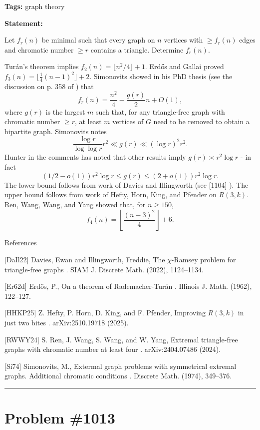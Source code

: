\documentclass{article}
\begin{document}
\noindent\textbf{Tags:} graph theory

\medskip

\noindent\textbf{Statement:}

Let $f_r(n)$ be minimal such that every graph on $n$ vertices with $\geq f_r(n)$ edges and chromatic number $\geq r$ contains a triangle. Determine $f_r(n)$.




Tur\'{a}n's theorem implies $f_2(n)=\lfloor n^2/4\rfloor+1$. Erd\H{o}s and Gallai \cite{Er62d} proved $f_3(n)=\lfloor \frac{1}{4}(n-1)^2\rfloor+2$. Simonovits showed in his PhD thesis (see the discussion on p. 358 of \cite{Si74}) that\[f_r(n)=\frac{n^2}{4}-\frac{g(r)}{2}{n}+O(1),\]where $g(r)$ is the largest $m$ such that, for any triangle-free graph with chromatic number $\geq r$, at least $m$ vertices of $G$ need to be removed to obtain a bipartite graph. Simonovits \cite{Si74} notes\[\frac{\log r}{\log\log r}r^2 \ll g(r) \ll (\log r)^2r^2.\]Hunter in the comments has noted that other results imply $g(r)\asymp r^2\log r$ - in fact\[(1/2-o(1))r^2\log r\leq g(r)\leq (2+o(1))r^2\log r.\]The lower bound follows from work of Davies and Illingworth \cite{DaIl22} (see [1104] ). The upper bound follows from work of Hefty, Horn, King, and Pfender \cite{HHKP25} on $R(3,k)$. Ren, Wang, Wang, and Yang \cite{RWWY24} showed that, for $n\geq 150$,\[f_4(n)=\left\lfloor\frac{(n-3)^2}{4}\right\rfloor+6.\]




References

[DaIl22] Davies, Ewan and Illingworth, Freddie, The {$\chi$}-{R}amsey problem for triangle-free graphs . SIAM J. Discrete Math. (2022), 1124--1134.

[Er62d] Erd\H{o}s, P., On a theorem of {R}ademacher-Tur\'{a}n . Illinois J. Math. (1962), 122--127.

[HHKP25] Z. Hefty, P. Horn, D. King, and F. Pfender, Improving $R(3,k)$ in just two bites . arXiv:2510.19718 (2025).

[RWWY24] S. Ren, J. Wang, S. Wang, and W. Yang, Extremal triangle-free graphs with chromatic number at least four . arXiv:2404.07486 (2024).

[Si74] Simonovits, M., Extermal graph problems with symmetrical extremal graphs. {A}dditional chromatic conditions . Discrete Math. (1974), 349--376.

\noindent\rule{\linewidth}{0.4pt}


\section{Problem \#1013}
\label{prob:1013}
\end{document}
